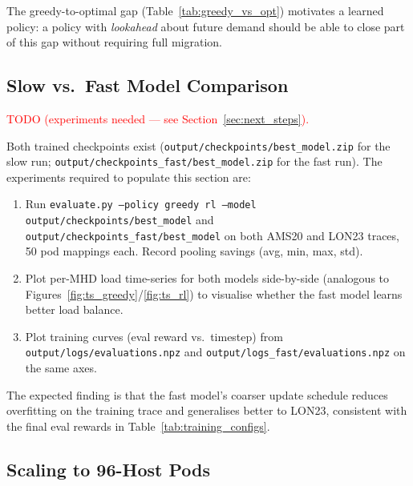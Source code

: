\documentclass[11pt]{article}
\newcommand{\red}[1]{\textcolor{red}{#1}}
\begin{document}
The greedy-to-optimal gap (Table~\ref{tab:greedy_vs_opt}) motivates a
learned policy: a policy with \emph{lookahead} about future demand should
be able to close part of this gap without requiring full migration.

\subsection{Slow vs.\ Fast Model Comparison}
\label{sec:slow_vs_fast}

\red{TODO (experiments needed --- see Section~\ref{sec:next_steps}).}

Both trained checkpoints exist (\texttt{output/checkpoints/best\_model.zip}
for the slow run; \texttt{output/checkpoints\_fast/best\_model.zip} for the
fast run).  The experiments required to populate this section are:

\begin{enumerate}
    \item Run \texttt{evaluate.py --policy greedy rl --model output/checkpoints/best\_model} and
          \texttt{output/checkpoints\_fast/best\_model} on both AMS20 and
          LON23 traces, 50 pod mappings each.  Record pooling savings
          (avg, min, max, std).
    \item Plot per-MHD load time-series for both models side-by-side
          (analogous to Figures~\ref{fig:ts_greedy}/\ref{fig:ts_rl}) to
          visualise whether the fast model learns better load balance.
    \item Plot training curves (eval reward vs.\ timestep) from
          \texttt{output/logs/evaluations.npz} and
          \texttt{output/logs\_fast/evaluations.npz} on the same axes.
\end{enumerate}

The expected finding is that the fast model's coarser update schedule
reduces overfitting on the training trace and generalises better to LON23,
consistent with the final eval rewards in Table~\ref{tab:training_configs}.

\subsection{Scaling to 96-Host Pods}
\label{sec:96hosts}
\end{document}
